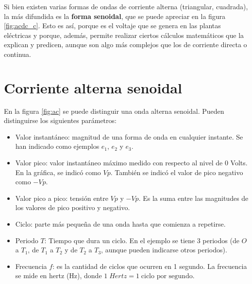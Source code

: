 Si bien existen varias formas de ondas de corriente alterna (triangular, cuadrada), la más difundida es la \textbf{forma senoidal}, que se puede apreciar en la figura \ref{fig:acdc_c}. Esto es así, porque es el voltaje que se genera en las plantas eléctricas y porque, además, permite realizar ciertos cálculos matemáticos que la explican y predicen, aunque son algo más complejos que los de corriente directa o continua.

\section{Corriente alterna senoidal}

En la figura \ref{fig:ac} se puede distinguir una onda alterna senoidal. Pueden distinguirse los siguientes parámetros:

\begin{itemize}
	\item Valor instantáneo: magnitud de una forma de onda en cualquier instante. Se han indicado como ejemplos $e_1$, $e_2$ y $e_3$.
	\item Valor pico: valor instantáneo máximo medido con respecto al nivel de 0 Volts. En la gráfica, se indicó como $Vp$. También se indicó el valor de pico negativo como $-Vp$.
	\item Valor pico a pico: tensión entre $Vp$ y $-Vp$. Es la suma entre las magnitudes de los valores de pico positivo y negativo.
	\item Ciclo: parte más pequeña de una onda hasta que comienza a repetirse.	
	\item Periodo $T$: Tiempo que dura un ciclo. En el ejemplo se tiene 3 periodos (de $O$ a $T_1$, de $T_1$ a $T_2$ y de $T_2$ a $T_3$, aunque pueden indicarse otros periodos).
	\item Frecuencia $f$: es la cantidad de ciclos que ocurren en 1 segundo. La frecuencia se mide en hertz (Hz), donde $1\; Hertz = 1\; \text{ciclo por segundo}$.
\end{itemize}

